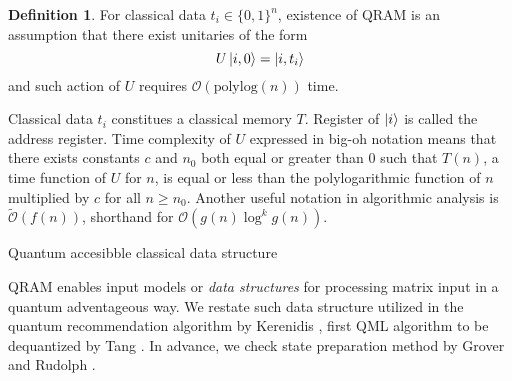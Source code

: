 \documentclass[10pt,twoside,reqno]{amsart} %
\makeatletter
\renewcommand{\section}{\@startsection{section}{1}
   \z@{.7\linespacing\@plus\linespacing}{.5\linespacing}
   {\normalfont\upshape\bfseries\centering}}
\theoremstyle{plain}
\theoremstyle{definition}
\newtheorem{defn}[thm]{Definition}
\makeatother
\begin{document}
\begin{defn}
  For classical data $t_i\in\{0,1\}^n$, existence of QRAM is an assumption
  that there exist unitaries of the form
  \[
    U\ket{i,0}=\ket{i,t_i}
  \]
  and such action of $U$ requires $\mathcal{O}(\textrm{polylog}(n))$ time.
\end{defn}

Classical data $t_i$ constitues a classical memory $T$. Register of $\ket{i}$
is called the address register. Time complexity of $U$ expressed in big-oh
notation means that there exists constants $c$ and $n_0$ both equal or greater
than $0$ such that $T(n)$, a time function of $U$ for $n$, is equal or less than
the polylogarithmic function of $n$ multiplied by $c$ for all $n\geq n_0$.
Another useful notation in algorithmic analysis is 
$\widetilde{\mathcal{O}}(f(n))$, shorthand for $\mathcal{O}(g(n)\log^k g(n))$.

\section{Quantum accesibble classical data structure}

QRAM enables input models or \emph{data structures} for processing matrix
input in a quantum adventageous way. We restate such data structure utilized
in the quantum recommendation algorithm by Kerenidis \cite{kerenidis2017},
first QML algorithm to be dequantized by Tang \cite{tang2019}. In advance,
we check state preparation method by Grover and Rudolph \cite{grover2002}.
\end{document}
